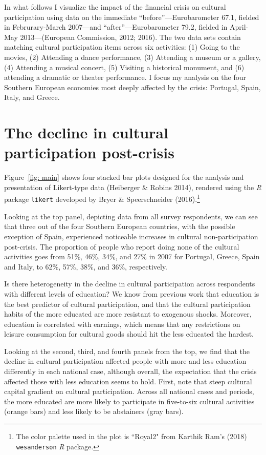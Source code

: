\documentclass{article}
\begin{document}
In what follows I visualize the impact of the financial crisis on cultural participation using data on the immediate ``before''---Eurobarometer 67.1, fielded in Februrary-March 2007---and ``after''---Eurobarometer 79.2, fielded in April-May 2013---(European Commission, 2012; 2016). The two data sets contain matching cultural participation items across six activities: (1) Going to the movies, (2) Attending a dance performance, (3) Attending a museum or a gallery, (4) Attending a musical concert, (5) Visiting a historical monument, and (6) attending a dramatic or theater performance. I focus my analysis on the four Southern European economies most deeply affected by the crisis: Portugal, Spain, Italy, and Greece. 

\section{The decline in cultural participation post-crisis}
Figure~\ref{fig: main} shows four stacked bar plots designed for the analysis and presentation of Likert-type data (Heiberger \& Robins 2014), rendered using the {\em} {\em R} package \texttt{likert} developed by Bryer \& Speerschneider (2016).\footnote{The color palette used in the plot is ``Royal2" from Karthik Ram's (2018) \texttt{wesanderson} {\em R} package.}  

Looking at the top panel, depicting data from all survey respondents, we can see that three out of the four Southern European countries, with the possible exception of Spain, experienced noticeable increases in cultural non-participation post-crisis. The proportion of people who report doing none of the cultural activities goes from 51\%, 46\%, 34\%, and 27\% in 2007 for Portugal, Greece, Spain and Italy, to 62\%, 57\%, 38\%, and 36\%, respectively. 

Is there heterogeneity in the decline in cultural participation across respondents with different levels of education? We know from previous work that education is the best predictor of cultural participation, and that the cultural participation habits of the more educated are more resistant to exogenous shocks. Moreover, education is correlated with earnings, which means that any restrictions on leisure consumption for cultural goods should hit the less educated the hardest. 

Looking at the second, third, and fourth panels from the top, we find that the decline in cultural participation affected people with more and less education differently in each national case, although overall, the expectation that the crisis affected those with less education seems to hold. First, note that steep cultural capital gradient on cultural participation. Across all national cases and periods, the more educated are more likely to participate in five-to-six cultural activities (orange bars) and less likely to be abstainers (gray bars).  
\end{document}
